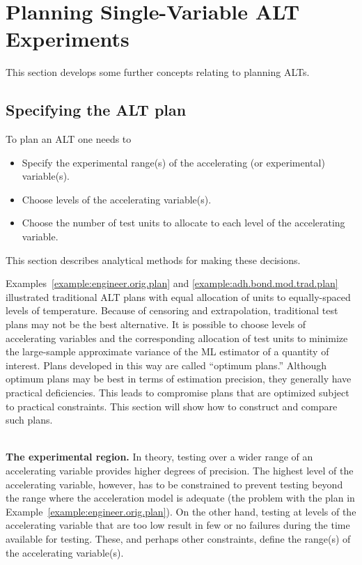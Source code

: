 \section{Planning Single-Variable ALT Experiments}
\label{section:alt.plan.sing.fact}
This section develops some further concepts relating to planning ALTs.  

\subsection{Specifying the ALT plan}
To plan an ALT one needs to
\begin {itemize}
\item
Specify the experimental range(s) of the accelerating
(or experimental) variable(s).
\item
Choose levels of the accelerating variable(s).
\item
Choose the number of test units to allocate to each
level of the accelerating variable.
\end {itemize}
This section describes analytical methods for making these decisions.

Examples~\ref{example:engineer.orig.plan} and
\ref{example:adh.bond.mod.trad.plan} illustrated traditional ALT
plans with equal allocation of units to equally-spaced levels of
temperature.  Because of censoring and extrapolation, traditional
test plans may not be the best alternative. It is possible to choose
levels of accelerating variables and the corresponding allocation of
test units to minimize the large-sample approximate variance of the
ML estimator of a quantity of interest. Plans developed in this way
are called ``optimum plans.''  Although optimum plans may be best in
terms of estimation precision, they generally have practical
deficiencies.  This leads to compromise plans that are optimized
subject to practical constraints.  This section will show how to
construct and compare such plans.

\mbox{ }\\
\noindent
{\bf The experimental region.} In theory, testing over a wider range
of an accelerating variable provides higher degrees of precision.
The highest level of the accelerating variable, however, has to be
constrained to prevent testing beyond the range where the
acceleration model is adequate (the problem with the plan in
Example~\ref{example:engineer.orig.plan}). On the other hand,
testing at levels of the accelerating variable that are too low
result in few or no failures during the time available for testing.
These, and perhaps other constraints, define the range(s) of the
accelerating variable(s).

